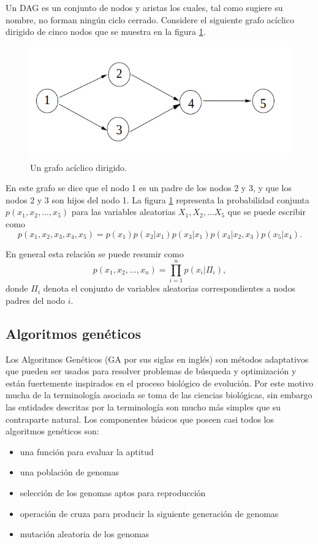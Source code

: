 \documentclass[10pt,a4paper]{article}
\begin{document}
Un DAG es un conjunto de nodos y aristas los cuales, tal como sugiere su nombre, no forman ningún ciclo cerrado. Considere el siguiente grafo acíclico dirigido de cinco nodos que se muestra en la figura \ref{fig:dag_example}.

\begin{figure}[h!tb!]
    \includegraphics[scale=0.4]{img/dag_example.png}
    \centering
    \caption{Un grafo acíclico dirigido.}
    \label{fig:dag_example}
\end{figure}

En este grafo se dice que el nodo 1 es un padre de los nodos 2 y 3, y que los nodos 2 y 3 son hijos del nodo 1. La figura \ref{fig:dag_example} representa la probabilidad conjunta $p(x_1,x_2,\dots,x_5)$ para las variables aleatorias $X_1, X_2, \dots X_5$ que se puede escribir como
\[
	p(x_1,x_2,x_3,x_4,x_5) = p(x_1) p(x_2 | x_1) p(x_3 | x_1) p(x_4 | x_2, x_3) p(x_5 | x_4).
\]

En general esta relación se puede resumir como
\[
	p(x_1,x_2,\dots,x_n) = \prod_{i=1}^n p \left( x_i | \Pi_i \right),
\]
donde $\Pi_i$ denota el conjunto de variables aleatorias correspondientes a nodos padres del nodo $i$.

\subsection{Algoritmos genéticos}
Los Algoritmos Genéticos (GA por sus siglas en inglés) son métodos adaptativos que pueden ser usados para resolver problemas de búsqueda y optimización y están fuertemente inspirados en el proceso biológico de evolución. Por este motivo mucha de la terminología asociada se toma de las ciencias biológicas, sin embargo las entidades descritas por la terminología son mucho más simples que su contraparte natural. Los componentes básicos que poseen casi todos los algoritmos genéticos son:

\begin{itemize}
\item una función para evaluar la aptitud
\item una población de genomas
\item selección de los genomas aptos para reproducción
\item operación de cruza para producir la siguiente generación de genomas
\item mutación aleatoria de los genomas
\end{itemize}
\end{document}
